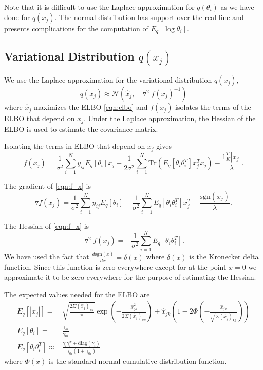 \documentclass[11pt]{amsart}
\begin{document}
Note that it is difficult to use the Laplace approximation for $q(\theta_i)$ as we have done for $q(x_j)$.  The normal distribution has support over the real line and presents complications for the computation of $E_q[\log \theta_i]$.

\subsection{Variational Distribution $q( x_j )$}

We use the Laplace approximation for the variational distribution $q(x_j)$, 
\begin{equation}
	q(x_j) \approx \mathcal{N} \left( \hat{x}_j, -\triangledown^2 f(x_j)^{-1} \right)
\end{equation}
where $\hat{x}_j$ maximizes the ELBO \eqref{eqn:elbo} and $f(x_j)$ isolates the terms of the ELBO that depend on $x_j$. Under the Laplace approximation, the Hessian of the ELBO is used to estimate the covariance matrix.

Isolating the terms in ELBO that depend on $x_j$ gives
\begin{equation}\label{eqn:f_x}
	f( x_j ) = \frac{1}{\sigma^2}\sum_{i=1}^N y_{ij}E_{q} [\theta_i] x_j - \frac{1}{2 \sigma^2}\sum_{i=1}^N \text{Tr}(E_q[ \theta_i \theta_i^T ] x_j^T x_j) -\frac{1^T_K | x_j | } { \lambda }.
\end{equation}

The gradient of \eqref{eqn:f_x} is
\begin{equation}
	\triangledown f( x_j ) =  \frac{1} { \sigma^2 } \sum_{i=1}^N y_{ij}E_{q} [\theta_i] - \frac{1}{\sigma^2}\sum_{i=1}^N E_q[ \theta_i \theta_i^T ] x_j^T -\frac{ \text{sgn} (x_j) } { \lambda }.
\end{equation}

The Hessian of \eqref{eqn:f_x} is
\begin{equation}
	\triangledown^2 f( x_j )=  - \frac{1}{\sigma^2}\sum_{i=1}^N E_q[ \theta_i \theta_i^T ].
\end{equation}
We have used the fact that $\frac{d\text{sgn} (x) } { dx } = \delta(x)$ where $\delta(x)$ is the Kronecker delta function. Since this function is zero everywhere except for at the point $x=0$ we approximate it to be zero everywhere for the purpose of estimating the Hessian.

 The expected values needed for the ELBO are
\begin{eqnarray}
	E_q[ |x_j| ] =& \sqrt{ \frac{ 2 \Sigma(\hat{x}_j)_{kk} } {\pi} } \exp \left( -\frac{ \hat{x}_{jk}^2 } { 2 \Sigma(\hat{x}_j)_{kk} } \right) + \hat{x}_{jk} \left( 1 - 2 \Phi \left( - \frac{ \hat{x}_{jk} } { \sqrt{ \Sigma(\hat{x}_j)_{kk} } } \right) \right)\\
	E_q[\theta_i] =& \frac{ \gamma_{ki} } { \gamma_{0i} } \\
	E_q[\theta_i \theta_i^T] \approx& \frac{ \gamma_i \gamma_i^T + \text{diag}(\gamma_i) } { \gamma_{0i} ( 1 + \gamma_{0i} ) }
\end{eqnarray}
where $\Phi(x)$ is the standard normal cumulative distribution function.
\end{document}
